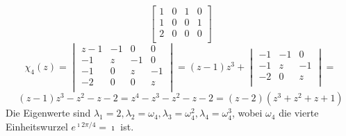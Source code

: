 \begin{flushenum}
\begin{itemize}
\[\begin{bmatrix}
					1 & 0 & 1 & 0 \\
					1 & 0 & 0 & 1 \\
					2 & 0 & 0 & 0 \\
				\end{bmatrix} \]
			\[ \chi_4(z) = 
				\begin{vmatrix}
					z-1 & -1 & 0 & 0 \\
					-1 & z & -1 & 0 \\
					-1 & 0 & z & -1 \\
					-2 & 0 & 0 & z \\
				\end{vmatrix} = 
				(z-1) z^3 + 
					\begin{vmatrix}
						-1 & -1 & 0 \\
						-1 & z & -1 \\
						-2 & 0 & z \\
					\end{vmatrix} = \] \[
				(z-1)z^3 - z^2 - z  - 2 =
				z^4 - z^3 - z^2 - z - 2 =
				(z-2)(z^3 + z^2 + z + 1) \]
			Die Eigenwerte sind $\lambda_1 = 2, \lambda_2 = \omega_4, \lambda_3 = \omega_4^2, \lambda_4 = \omega_4^3$,
			wobei $\omega_4$ die vierte Einheitswurzel $e^{\imath 2 \pi / 4} = \imath$ ist.
	\end{itemize}


\end{flushenum}
